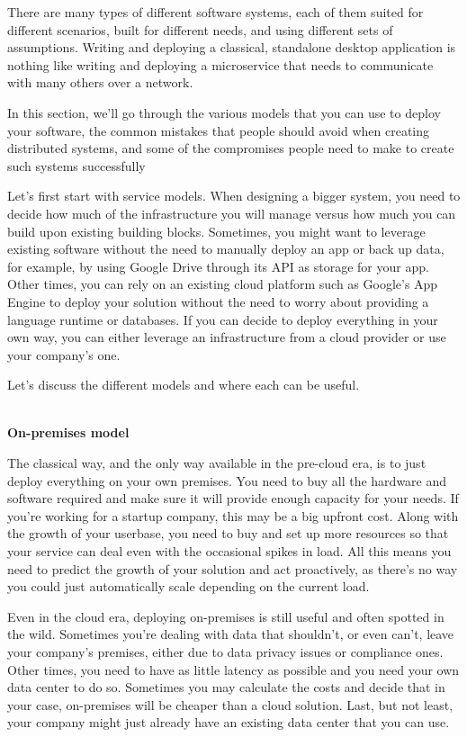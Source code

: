 
There are many types of different software systems, each of them suited for different scenarios, built for different needs, and using different sets of assumptions. Writing and deploying a classical, standalone desktop application is nothing like writing and deploying a microservice that needs to communicate with many others over a network.

In this section, we'll go through the various models that you can use to deploy your software, the common mistakes that people should avoid when creating distributed systems, and some of the compromises people need to make to create such systems successfully


Let's first start with service models. When designing a bigger system, you need to decide how much of the infrastructure you will manage versus how much you can build upon existing building blocks. Sometimes, you might want to leverage existing software without the need to manually deploy an app or back up data, for example, by using Google Drive through its API as storage for your app. Other times, you can rely on an existing cloud platform such as Google's App Engine to deploy your solution without the need to worry about providing a language runtime or databases. If you can decide to deploy everything in your own way, you can either leverage an infrastructure from a cloud provider or use your company's one.

Let's discuss the different models and where each can be useful.

\hspace*{\fill} \\ %
\noindent
\textbf{On-premises model}

The classical way, and the only way available in the pre-cloud era, is to just deploy everything on your own premises. You need to buy all the hardware and software required and make sure it will provide enough capacity for your  needs. If you're working for a startup company, this may be a big upfront cost. Along with the growth of your userbase, you need to buy and set up more resources so that your service can deal even with the occasional spikes in load. All this means you need to predict the growth of your solution and act proactively, as there's no way you could just automatically scale depending on the current load.

Even in the cloud era, deploying on-premises is still useful and often spotted in the wild. Sometimes you're dealing with data that shouldn't, or even can't, leave your company's premises, either due to data privacy issues or compliance ones. Other times, you need to have as little latency as possible and you need your own data center to do so. Sometimes you may calculate the costs and decide that in your case, on-premises will be cheaper than a cloud solution. Last, but not least, your company might just already have an existing data center that you can use.


